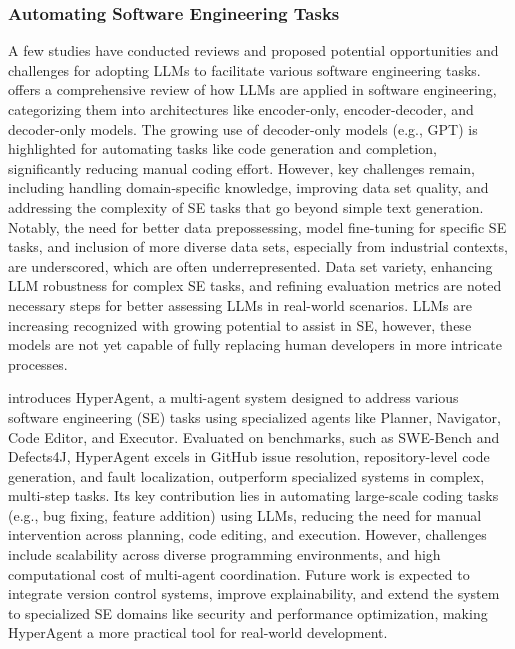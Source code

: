 \subsubsection{Automating Software Engineering Tasks}
A few studies have conducted reviews and proposed potential opportunities and challenges for adopting LLMs to facilitate various software engineering tasks. \citet{hou2023large} offers a comprehensive review of how LLMs are applied in software engineering, categorizing them into architectures like encoder-only, encoder-decoder, and decoder-only models. The growing use of decoder-only models (e.g., GPT) is highlighted for automating tasks like code generation and completion, significantly reducing manual coding effort. However, key challenges remain, including handling domain-specific knowledge, improving data set quality, and addressing the complexity of SE tasks that go beyond simple text generation. Notably, the need for better data prepossessing, model fine-tuning for specific SE tasks, and inclusion of more diverse data sets, especially from industrial contexts, are underscored, which are often underrepresented. Data set variety, enhancing LLM robustness for complex SE tasks, and refining evaluation metrics are noted necessary steps for better assessing LLMs in real-world scenarios. LLMs are increasing recognized with growing potential to assist in SE, however, these models are not yet capable of fully replacing human developers in more intricate processes. 

\citet{phan2024hyperagent} introduces HyperAgent, a multi-agent system designed to address various software engineering (SE) tasks using specialized agents like Planner, Navigator, Code Editor, and Executor. Evaluated on benchmarks, such as SWE-Bench and Defects4J, HyperAgent excels in GitHub issue resolution, repository-level code generation, and fault localization, outperform specialized systems in complex, multi-step tasks. Its key contribution lies in automating large-scale coding tasks (e.g., bug fixing, feature addition) using LLMs, reducing the need for manual intervention across planning, code editing, and execution. However, challenges include scalability across diverse programming environments, and high computational cost of multi-agent coordination. Future work is expected to integrate version control systems, improve explainability, and extend the system to specialized SE domains like security and performance optimization, making HyperAgent a more practical tool for real-world development.

